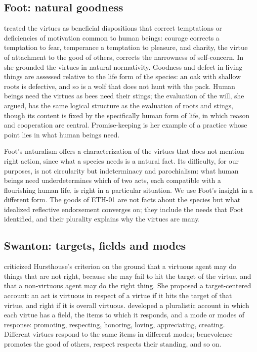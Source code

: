 \documentclass{situationist-preprint}
\begin{document}
\subsection{Foot: natural goodness}

\citet{Foot1978} treated the virtues as beneficial dispositions that correct temptations or deficiencies of motivation common to human beings: courage corrects a temptation to fear, temperance a temptation to pleasure, and charity, the virtue of attachment to the good of others, corrects the narrowness of self-concern. In \citet{Foot2001} she grounded the virtues in natural normativity. Goodness and defect in living things are assessed relative to the life form of the species: an oak with shallow roots is defective, and so is a wolf that does not hunt with the pack. Human beings need the virtues as bees need their stings; the evaluation of the will, she argued, has the same logical structure as the evaluation of roots and stings, though its content is fixed by the specifically human form of life, in which reason and cooperation are central. Promise-keeping is her example of a practice whose point lies in what human beings need.

Foot's naturalism offers a characterization of the virtues that does not mention right action, since what a species needs is a natural fact. Its difficulty, for our purposes, is not circularity but indeterminacy and parochialism: what human beings need underdetermines which of two acts, each compatible with a flourishing human life, is right in a particular situation. We use Foot's insight in a different form. The goods of ETH-01 are not facts about the species but what idealized reflective endorsement converges on; they include the needs that Foot identified, and their plurality explains why the virtues are many.

\subsection{Swanton: targets, fields and modes}

\citet{Swanton2001} criticized Hursthouse's criterion on the ground that a virtuous agent may do things that are not right, because she may fail to hit the target of the virtue, and that a non-virtuous agent may do the right thing. She proposed a target-centered account: an act is virtuous in respect of a virtue if it hits the target of that virtue, and right if it is overall virtuous. \citet{Swanton2003} developed a pluralistic account in which each virtue has a field, the items to which it responds, and a mode or modes of response: promoting, respecting, honoring, loving, appreciating, creating. Different virtues respond to the same items in different modes; benevolence promotes the good of others, respect respects their standing, and so on.
\end{document}
